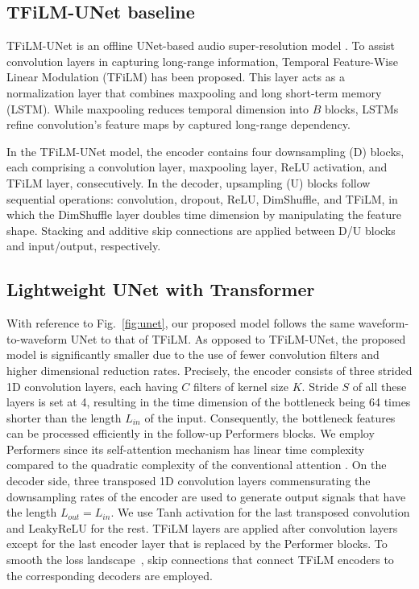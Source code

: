 \documentclass{article}
\begin{document}
\subsection{TFiLM-UNet baseline}
TFiLM-UNet is an offline UNet-based audio super-resolution model \cite{birnbaum2021temporal}. To assist convolution layers in capturing long-range information, Temporal Feature-Wise Linear Modulation (TFiLM) has been proposed. This layer acts as a normalization layer that combines maxpooling and long short-term memory (LSTM). While maxpooling reduces temporal dimension into $B$ blocks, LSTMs refine convolution's feature maps by captured long-range dependency.

In the TFiLM-UNet model, the encoder contains four downsampling (D) blocks, each comprising a convolution layer, maxpooling layer, ReLU activation, and TFiLM layer, consecutively. In the decoder, upsampling (U) blocks follow sequential operations: convolution, dropout, ReLU, DimShuffle, and TFiLM, in which the DimShuffle layer doubles time dimension by manipulating the feature shape. Stacking and additive skip connections are applied between D/U blocks and input/output, respectively.
\vspace{-0.2cm}
\subsection{Lightweight UNet with Transformer}

With reference to Fig.~\ref{fig:unet}, our proposed model follows the same waveform-to-waveform UNet to that of TFiLM. As opposed to TFiLM-UNet, the proposed model is significantly smaller due to the use of fewer convolution filters and higher dimensional reduction rates. Precisely, the encoder consists of three strided 1D convolution layers, each having $C$ filters of kernel size $K$. Stride $S$ of all these layers is set at 4, resulting in the time dimension of the bottleneck being 64 times shorter than the length $L_{in}$ of the input. Consequently, the bottleneck features can be processed efficiently in the follow-up Performers \cite{choromanski2021rethinking} blocks. We employ Performers since its self-attention mechanism has linear time complexity compared to the quadratic complexity of the conventional attention \cite{vaswani2017attention}. On the decoder side, three transposed 1D convolution layers commensurating the downsampling rates of the encoder are used to generate output signals that have the length $L_{out}=L_{in}$. We use Tanh activation for the last transposed convolution and LeakyReLU \cite{Maas2013RectifierNI} for the rest. TFiLM layers are applied after convolution layers except for the last encoder layer that is replaced by the Performer blocks. To smooth the loss landscape~\cite{Wang2020IsTS}, skip connections that connect TFiLM encoders to the corresponding decoders are employed.
\end{document}
